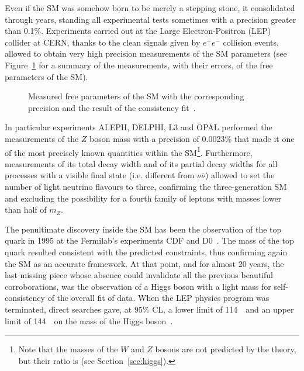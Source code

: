 Even if the SM was somehow born to be merely a stepping stone, 
it consolidated through years, standing all experimental tests 
sometimes with a precision greater than 0.1\%. Experiments carried 
out at the Large Electron-Positron (LEP) collider at CERN, 
thanks to the clean signals given by $e^{+}e^{-}$ collision events, 
allowed to obtain very high precision measurements of the SM parameters
(see Figure~\ref{fig:smparam} for a summary of the measurements, with
their errors, of the free parameters of the SM).
\begin{figure}[htb]\begin{center}
	\caption{Measured free parameters of the SM with the corresponding
          precision and the result of the consistency fit~\cite{Renton}.\label{fig:smparam}}
\end{center}\end{figure}
 
In particular experiments ALEPH, DELPHI, L3 and OPAL performed the measurements 
of the $Z$ boson mass with a precision of 0.0023\% that made it one of the most 
precisely known quantities within the SM\footnote{Note that the masses of the 
$W$ and $Z$ bosons are not predicted by the theory, but their ratio is (see 
Section~\ref{sec:higgs}).}. Furthermore, measurements of its total 
decay width and of its partial decay widths for all processes with a 
visible final state (i.e. different from $\nu\bar\nu$) allowed to set 
the number of light neutrino flavours to three, confirming the three-generation 
SM and excluding the possibility for a fourth family of leptons with masses
 lower than half of $m_Z$.

The penultimate discovery inside the SM has been the observation of the 
top quark in 1995 at the Fermilab's experiments CDF and 
D0~\cite{PhysRevLett.74.2626,PhysRevLett.74.2422}. 
The mass of the top quark resulted consistent with the predicted 
constraints, thus confirming again the SM as an accurate framework. 
At that point, and for almost 20 years, the last missing piece whose
absence could invalidate all the previous beautiful corroborations, was
the observation of a Higgs boson with a light mass for  self-consistency 
of the overall fit of data. When the LEP physics program was terminated,
direct searches gave, at 95\% CL, a lower limit of 114~\gev\ and an upper 
limit of 144~\gev\ on the mass of the Higgs boson~\cite{Renton}.

